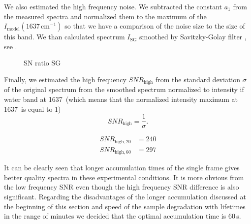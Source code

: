 We also estimated the high frequency noise. We subtracted the constant $a_1$
from the measured spectra and normalized them to the maximum of the
$I_\text{model}(1637\,\text{cm}^{-1})$
so that we have a comparison of the noise size to the size of this band. We
than calculated spectrum $I_\text{SG}$ smoothed by Savitzky-Golay filter
\CITATION,
see
.

\begin{figure}
	\centering
	
	\caption{SN ratio SG}
	\label{\figlabel{accum_length:sn_ratio_sg}}
\end{figure}

Finally, we estimated the high frequency $SNR_\text{high}$ from the standard
deviation $\sigma$ of the original spectrum from the smoothed spectrum
normalized to intensity if water band at 1637\,\icm{} (which means that the
normalized intensity maximum at 1637\,\icm{} is equal to 1)
\begin{equation*}
	SNR_\text{high} = \frac{1}{\sigma}.
\end{equation*}

\begin{align*}
	SNR_{\text{high},20} &= 240 \\
	SNR_{\text{high},60} &= 297
\end{align*}

It can be clearly seen that longer accumulation times of the single frame gives
better quality spectra in these experimental conditions. It is more obvious
from the low frequency SNR even though the high frequency SNR difference is
also significant. Regarding the disadvantages of the
longer accumulation discussed at the beginning of this section and speed of
the sample degradation with lifetimes in the range of minutes we decided that
the optimal accumulation time is 60\,s.
